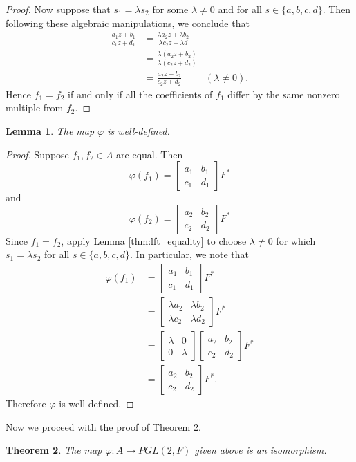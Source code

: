 \documentclass[12pt]{article}
\newcommand{\lftmat}[4]{\begin{bmatrix} {#1} & {#2} \\ {#3} & {#4} \end{bmatrix}}
\theoremstyle{plain}
\newtheorem{theorem}{Theorem}[section]
\newtheorem{lemma}[theorem]{Lemma}
\theoremstyle{definition}
\begin{document}
\begin{appendices}
\begin{proof}
	Now suppose that $s_1 = \lambda s_2$ for some $\lambda\neq 0$ and for all $s\in\{a,b,c,d\}$. Then following these algebraic manipulations, we conclude that
	\begin{align*}
		\frac{a_1z + b_1}{c_1z + d_1} & = \frac{\lambda a_2z + \lambda b_2}{\lambda c_2z + \lambda d}\\
		& = \frac{\lambda(a_2z + b_2)}{\lambda(c_2z + d_2)}\\
		& = \frac{a_2z + b_2}{c_2z + d_2} & (\lambda \neq 0).
	\end{align*}
	Hence $f_1 = f_2$ if and only if all the coefficients of $f_1$ differ by the same nonzero multiple from $f_2$.
\end{proof}

\begin{lemma}\label{thm:well_defined}
	The map $\varphi$ is well-defined.
\end{lemma}

\begin{proof}
	Suppose $f_1,f_2\in A$ are equal. Then
	\[
		\varphi(f_1) = \lftmat{a_1}{b_1}{c_1}{d_1} F^*
	\]
	and 
	\[
		\varphi(f_2) = \lftmat{a_2}{b_2}{c_2}{d_2} F^*
	\]
	Since $f_1 = f_2$, apply Lemma \ref{thm:lft_equality} to choose $\lambda\neq 0$ for which $s_1 = \lambda s_2$ for all $s\in\{a,b,c,d\}$. In particular, we note that
	\begin{align*}
		\varphi(f_1) & = \lftmat{a_1}{b_1}{c_1}{d_1} F^*\\
		& = \lftmat{\lambda a_2}{\lambda b_2}{\lambda c_2}{\lambda d_2} F^*\\
		& = \lftmat{\lambda}{0}{0}{\lambda}\lftmat{a_2}{b_2}{c_2}{d_2} F^*\\
		& = \lftmat{a_2}{b_2}{c_2}{d_2} F^*.
	\end{align*}
	Therefore $\varphi$ is well-defined.
\end{proof}

Now we proceed with the proof of Theorem \ref{thm:function_correspondence}.		
	
\begin{theorem}\label{thm:function_correspondence}
	The map $\varphi\colon A\rightarrow PGL(2,F)$ given above is an isomorphism.
\end{theorem}
	

\end{appendices}
\end{document}
